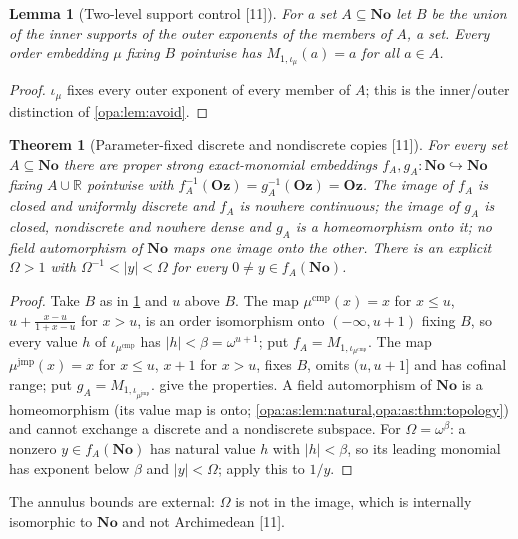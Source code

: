 \documentclass[11pt,oneside]{article}
\numberwithin{equation}{section}
\newtheorem{theorem}{Theorem}[section]
\newtheorem{lemma}[lemma]{Lemma}
\theoremstyle{definition}
\theoremstyle{remark}
\newcommand{\No}{\mathbf{No}}
\newcommand{\Oz}{\mathbf{Oz}}
\newcommand{\R}{\mathbb R}
\newcommand{\src}[1]{\textup{\textsf{\small[#1]}}}
\begin{document}
\begin{lemma}[Two-level support control \src{11}]\label{opa:as:lem:parameters}
For a set $A\subseteq\No$ let $B$ be the union of the inner supports of the outer exponents of the members of $A$,
a set. Every order embedding $\mu$ fixing $B$ pointwise has $M_{1,\iota_\mu}(a)=a$ for all $a\in A$.
\end{lemma}
\begin{proof}
$\iota_\mu$ fixes every outer exponent of every member of $A$; this is the inner/outer distinction of
\cref{opa:lem:avoid}.
\end{proof}

\begin{theorem}[Parameter-fixed discrete and nondiscrete copies \src{11}]\label{opa:as:thm:parameters}
For every set $A\subseteq\No$ there are proper strong exact-monomial embeddings $f_A,g_A:\No\hookrightarrow\No$
fixing $A\cup\R$ pointwise with $f_A^{-1}(\Oz)=g_A^{-1}(\Oz)=\Oz$. The image of $f_A$ is closed and uniformly
discrete and $f_A$ is nowhere continuous; the image of $g_A$ is closed, nondiscrete and nowhere dense and $g_A$ is a
homeomorphism onto it; no field automorphism of $\No$ maps one image onto the other. There is an explicit
$\Omega>1$ with $\Omega^{-1}<|y|<\Omega$ for every $0\ne y\in f_A(\No)$.
\end{theorem}
\begin{proof}
Take $B$ as in \cref{opa:as:lem:parameters} and $u$ above $B$. The map $\mu^{\mathrm{cmp}}(x)=x$ for $x\le u$,
$u+\frac{x-u}{1+x-u}$ for $x>u$, is an order isomorphism onto $(-\infty,u+1)$ fixing $B$, so every value $h$ of
$\iota_{\mu^{\mathrm{cmp}}}$ has $|h|<\beta=\omega^{u+1}$; put $f_A=M_{1,\iota_{\mu^{\mathrm{cmp}}}}$. The map
$\mu^{\mathrm{jmp}}(x)=x$ for $x\le u$, $x+1$ for $x>u$, fixes $B$, omits $(u,u+1]$ and has cofinal range; put
$g_A=M_{1,\iota_{\mu^{\mathrm{jmp}}}}$. 
give the properties. A field automorphism of $\No$ is a homeomorphism (its value map is onto;
\cref{opa:as:lem:natural,opa:as:thm:topology}) and cannot exchange a discrete and a nondiscrete subspace. For
$\Omega=\omega^\beta$: a nonzero $y\in f_A(\No)$ has natural value $h$ with $|h|<\beta$, so its leading monomial has
exponent below $\beta$ and $|y|<\Omega$; apply this to $1/y$.
\end{proof}

The annulus bounds are external: $\Omega$ is not in the image, which is internally isomorphic to $\No$ and not
Archimedean \src{11}.
\end{document}
